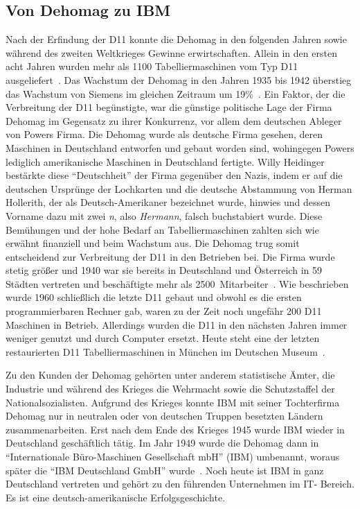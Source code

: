 \documentclass[parskip=half]{scrartcl}
\begin{document}
\subsection{Von Dehomag zu IBM}

Nach der Erfindung der D11 konnte die Dehomag in den folgenden Jahren sowie
während des zweiten Weltkrieges Gewinne erwirtschaften. Allein in den ersten
acht Jahren wurden mehr als 1100 Tabelliermaschinen vom Typ D11
ausgeliefert~\cite{Kist95}. Das Wachstum der Dehomag in den Jahren 1935 bis
1942 überstieg das Wachstum von Siemens im gleichen Zeitraum um
19\%~\cite{heide2009punched}. Ein Faktor, der die Verbreitung der D11
begünstigte, war die günstige politische Lage der Firma Dehomag im Gegensatz zu
ihrer Konkurrenz, vor allem dem deutschen Ableger von Powers Firma. Die Dehomag
wurde als deutsche Firma gesehen, deren Maschinen in Deutschland entworfen und
gebaut worden sind, wohingegen Powers lediglich amerikanische Maschinen in
Deutschland fertigte.  Willy Heidinger bestärkte diese \enquote{Deutschheit}
der Firma gegenüber den Nazis, indem er auf die deutschen Ursprünge der
Lochkarten und die deutsche Abstammung von Herman Hollerith, der als
Deutsch-Amerikaner bezeichnet wurde, hinwies und dessen Vorname dazu mit zwei
\emph{n}, also \emph{Hermann}, falsch buchstabiert wurde. Diese Bemühungen und
der hohe Bedarf an Tabelliermaschinen zahlten sich wie erwähnt finanziell und
beim Wachstum aus. Die Dehomag trug somit entscheidend zur Verbreitung der D11
in den Betrieben bei. Die Firma wurde stetig größer und 1940 war sie bereits in
Deutschland und Österreich in 59 Städten vertreten und beschäftigte mehr als
2500~Mitarbeiter~\cite{dingwerth}. Wie beschrieben wurde 1960 schließlich die
letzte D11 gebaut und obwohl es die ersten programmierbaren Rechner gab, waren
zu der Zeit noch ungefähr 200 D11 Maschinen in Betrieb. Allerdings wurden die
D11 in den nächsten Jahren immer weniger genutzt und durch Computer ersetzt.
Heute steht eine der letzten restaurierten D11 Tabelliermaschinen in München im
Deutschen Museum~\cite{Kist95}.

Zu den Kunden der Dehomag gehörten unter anderem statistische Ämter, die
Industrie und während des Krieges die Wehrmacht sowie die Schutzstaffel der
Nationalsozialisten. Aufgrund des Krieges konnte IBM mit seiner Tochterfirma
Dehomag nur in neutralen oder von deutschen Truppen besetzten Ländern
zusammenarbeiten. Erst nach dem Ende des Krieges 1945 wurde IBM wieder in
Deutschland geschäftlich tätig. Im Jahr 1949 wurde die Dehomag dann in
\enquote{Internationale Büro-Maschinen Gesellschaft mbH} (IBM) umbenannt,
woraus später die \enquote{IBM Deutschland GmbH} wurde~\cite{sendler}.
Noch heute ist IBM in ganz Deutschland vertreten und gehört zu den führenden
Unternehmen im IT- Bereich. Es ist eine deutsch-amerikanische
Erfolgsgeschichte.
\end{document}
